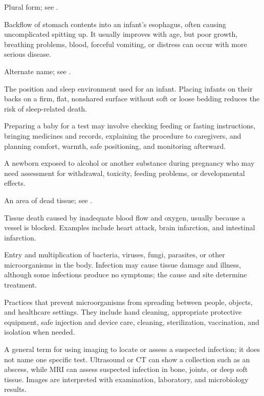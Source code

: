  Plural form; see .

 Backflow of stomach contents into an infant’s esophagus, often causing uncomplicated spitting up. It usually improves with age, but poor growth, breathing problems, blood, forceful vomiting, or distress can occur with more serious disease.

 Alternate name; see .

 The position and sleep environment used for an infant. Placing infants on their backs on a firm, flat, nonshared surface without soft or loose bedding reduces the risk of sleep-related death.

 Preparing a baby for a test may involve checking feeding or fasting instructions, bringing medicines and records, explaining the procedure to caregivers, and planning comfort, warmth, safe positioning, and monitoring afterward.

 A newborn exposed to alcohol or another substance during pregnancy who may need assessment for withdrawal, toxicity, feeding problems, or developmental effects.

 An area of dead tissue; see .

 Tissue death caused by inadequate blood flow and oxygen, usually because a vessel is blocked. Examples include heart attack, brain infarction, and intestinal infarction.

 Entry and multiplication of bacteria, viruses, fungi, parasites, or other microorganisms in the body. Infection may cause tissue damage and illness, although some infections produce no symptoms; the cause and site determine treatment.

 Practices that prevent microorganisms from spreading between people, objects, and healthcare settings. They include hand cleaning, appropriate protective equipment, safe injection and device care, cleaning, sterilization, vaccination, and isolation when needed.

 A general term for using imaging to locate or assess a suspected infection; it does not name one specific test. Ultrasound or CT can show a collection such as an abscess, while MRI can assess suspected infection in bone, joints, or deep soft tissue. Images are interpreted with examination, laboratory, and microbiology results.

